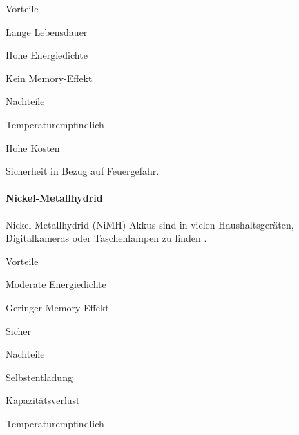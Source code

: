 \documentclass[../main.tex]{subfiles}
\begin{document}
\begin{minipage}[t]{0.48\textwidth}
\begin{items}
  \item [Vorteile]
  \item Lange Lebensdauer
  \item Hohe Energiedichte
  \item Kein Memory-Effekt
\end{items}
\end{minipage}
\hfill
\begin{minipage}[t]{0.48\textwidth}
\begin{items}
  \item [Nachteile]
  \item Temperaturempfindlich
  \item Hohe Kosten
  \item Sicherheit in Bezug auf Feuergefahr.
\end{items}
\end{minipage}
 

\paragraph{Nickel-Metallhydrid}

Nickel-Metallhydrid (NiMH) Akkus sind in vielen Haushaltsgeräten, Digitalkameras oder Taschenlampen zu finden \cite{nimh}.

\begin{minipage}[t]{0.48\textwidth}
\begin{items}
  \item [Vorteile]
  \item Moderate Energiedichte
  \item Geringer Memory Effekt
  \item Sicher
\end{items}
\end{minipage}
\hfill
\begin{minipage}[t]{0.48\textwidth}
\begin{items}
  \item [Nachteile]
  \item Selbstentladung
  \item Kapazitätsverlust
  \item Temperaturempfindlich
\end{items}
\end{minipage}
\end{document}
